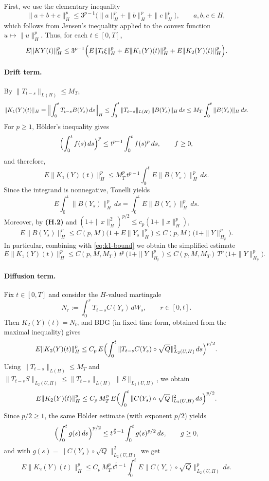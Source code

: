 \documentclass[11pt]{article}
\theoremstyle{definition}
\theoremstyle{remark}
\begin{document}
First, we use the elementary inequality
\begin{equation}\label{eq:sum-p-ineq}
    \|a+b+c\|_H^p
    \le
    3^{p-1}\bigl(\|a\|_H^p+\|b\|_H^p+\|c\|_H^p\bigr),
    \qquad a,b,c\in H,
\end{equation}
which follows from Jensen's inequality applied to the convex function $u\mapsto \|u\|_H^p$.
Thus, for each $t\in[0,T]$,
\[
    E\|KY(t)\|_H^p
    \le
    3^{p-1}\Bigl(E\|T_t\xi\|_H^p + E\|K_1(Y)(t)\|_H^p + E\|K_2(Y)(t)\|_H^p\Bigr).
\]

\paragraph{Drift term.}
By $\|T_{t-s}\|_{L(H)}\le M_T$,
\[
    \|K_1(Y)(t)\|_H
    =
    \Bigl\|\int_0^t T_{t-s}B(Y_s)\,ds\Bigr\|_H
    \le
    \int_0^t \|T_{t-s}\|_{L(H)}\,\|B(Y_s)\|_H\,ds
    \le
    M_T\int_0^t \|B(Y_s)\|_H\,ds.
\]
For $p\ge 1$, H\"older's inequality gives
\[
    \Bigl(\int_0^t f(s)\,ds\Bigr)^p
    \le
    t^{p-1}\int_0^t f(s)^p\,ds,
    \qquad f\ge 0,
\]
and therefore,
\begin{equation}\label{eq:k1-bound}
    E\|K_1(Y)(t)\|_H^p
    \le
    M_T^p\,t^{p-1}\int_0^t E\|B(Y_s)\|_H^p\,ds.
\end{equation}
Since the integrand is nonnegative, Tonelli yields
\[
    E\int_0^t \|B(Y_s)\|_H^p\,ds
    =
    \int_0^t E\|B(Y_s)\|_H^p\,ds.
\]
Moreover, by \textbf{(H.2)} and $(1+\|x\|_H^2)^{p/2}\le c_p(1+\|x\|_H^p)$,
\[
    E\|B(Y_s)\|_H^p
    \le
    C(p,M)\bigl(1+E\|Y_s\|_H^p\bigr)
    \le
    C(p,M)\bigl(1+\|Y\|_{H_p}^p\bigr).
\]
In particular, combining with \eqref{eq:k1-bound} we obtain the simplified estimate
\[
    E\|K_1(Y)(t)\|_H^p
    \le
    C(p,M,M_T)\,t^{p}\,\bigl(1+\|Y\|_{H_p}^p\bigr)
    \le
    C(p,M,M_T)\,T^{p}\,\bigl(1+\|Y\|_{H_p}^p\bigr).
\]

\paragraph{Diffusion term.}
Fix $t\in[0,T]$ and consider the $H$-valued martingale
\[
    N_r := \int_0^r T_{t-s}C(Y_s)\,dW_s,
    \qquad r\in[0,t].
\]
Then $K_2(Y)(t)=N_t$, and BDG (in fixed time form, obtained from the maximal inequality) gives
\[
    E\|K_2(Y)(t)\|_H^p
    \le
    C_p\,E\Bigl(\int_0^t \|T_{t-s}C(Y_s)\circ\sqrt{Q}\|_{L_2(U,H)}^2\,ds\Bigr)^{p/2}.
\]
Using $\|T_{t-s}\|_{L(H)}\le M_T$ and $\|T_{t-s}S\|_{L_2(U,H)}\le \|T_{t-s}\|_{L(H)}\,\|S\|_{L_2(U,H)}$,
we obtain
\[
    E\|K_2(Y)(t)\|_H^p
    \le
    C_p\,M_T^p\,E\Bigl(\int_0^t \|C(Y_s)\circ\sqrt{Q}\|_{L_2(U,H)}^2\,ds\Bigr)^{p/2}.
\]
Since $p/2\ge 1$, the same H\"older estimate (with exponent $p/2$) yields
\[
    \Bigl(\int_0^t g(s)\,ds\Bigr)^{p/2}
    \le
    t^{\frac p2-1}\int_0^t g(s)^{p/2}\,ds,
    \qquad g\ge 0,
\]
and with $g(s)=\|C(Y_s)\circ\sqrt{Q}\|_{L_2(U,H)}^2$ we get
\begin{equation}\label{eq:k2-bound}
    E\|K_2(Y)(t)\|_H^p
    \le
    C_p\,M_T^p\,t^{\frac p2-1}\int_0^t E\|C(Y_s)\circ\sqrt{Q}\|_{L_2(U,H)}^p\,ds.
\end{equation}
\end{document}
